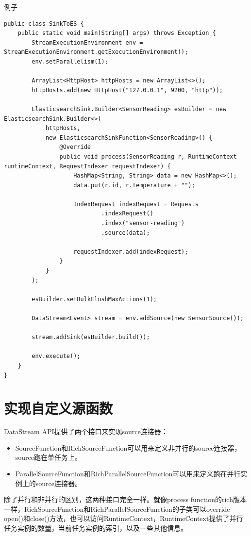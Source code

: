 \documentclass[cn,11pt,chinese]{elegantbook}
\begin{document}
例子

\begin{verbatim}
public class SinkToES {
    public static void main(String[] args) throws Exception {
        StreamExecutionEnvironment env = StreamExecutionEnvironment.getExecutionEnvironment();
        env.setParallelism(1);

        ArrayList<HttpHost> httpHosts = new ArrayList<>();
        httpHosts.add(new HttpHost("127.0.0.1", 9200, "http"));

        ElasticsearchSink.Builder<SensorReading> esBuilder = new ElasticsearchSink.Builder<>(
            httpHosts,
            new ElasticsearchSinkFunction<SensorReading>() {
                @Override
                public void process(SensorReading r, RuntimeContext runtimeContext, RequestIndexer requestIndexer) {
                    HashMap<String, String> data = new HashMap<>();
                    data.put(r.id, r.temperature + "");

                    IndexRequest indexRequest = Requests
                            .indexRequest()
                            .index("sensor-reading")
                            .source(data);

                    requestIndexer.add(indexRequest);
                }
            }
        );

        esBuilder.setBulkFlushMaxActions(1);

        DataStream<Event> stream = env.addSource(new SensorSource());

        stream.addSink(esBuilder.build());

        env.execute();
    }
}
\end{verbatim}

\section{实现自定义源函数}

DataStream API提供了两个接口来实现source连接器：

\begin{itemize}
    \item SourceFunction和RichSourceFunction可以用来定义非并行的source连接器，source跑在单任务上。
    \item ParallelSourceFunction和RichParallelSourceFunction可以用来定义跑在并行实例上的source连接器。
\end{itemize}

除了并行和非并行的区别，这两种接口完全一样。就像process function的rich版本一样，RichSourceFunction和RichParallelSourceFunction的子类可以override open()和close()方法，也可以访问RuntimeContext，RuntimeContext提供了并行任务实例的数量，当前任务实例的索引，以及一些其他信息。
\end{document}

